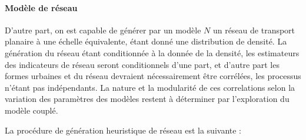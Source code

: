 \paragraph{Modèle de réseau}

D'autre part, on est capable de générer par un modèle $N$ un réseau de transport planaire à une échelle équivalente, étant donné une distribution de densité. La génération du réseau étant conditionnée à la donnée de la densité, les estimateurs des indicateurs de réseau seront conditionnels d'une part, et d'autre part les formes urbaines et du réseau devraient nécessairement être corrélées, les processus n'étant pas indépendants. La nature et la modularité de ces correlations selon la variation des paramètres des modèles restent à déterminer par l'exploration du modèle couplé.

La procédure de génération heuristique de réseau est la suivante :
